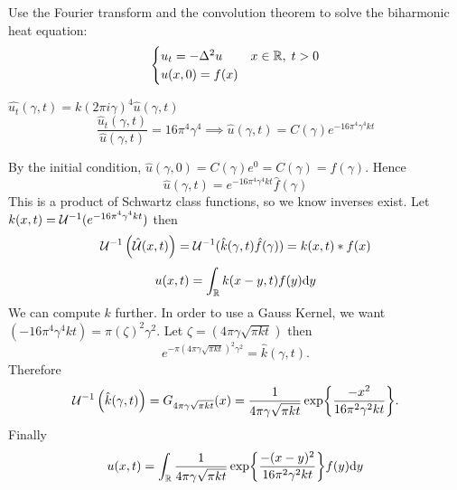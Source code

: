 Use the Fourier transform and the convolution theorem to solve the biharmonic heat equation:
$$\begin{cases}
    u_t = -\Delta^2 u & x \in \mathbb{R}, \; t>0\\
    u(x,0) = f(x)
\end{cases}
$$

\soln* 

$\hat{u_t}(\gamma, t) = k (2\pi i \gamma)^4 \hat{u}(\gamma, t)$
$$\frac{\hat{u}_t(\gamma, t)}{\hat{u}(\gamma, t)} = 16\pi^4 \gamma^4 \implies \hat{u}(\gamma,t) = C(\gamma)e^{-16\pi^4 \gamma^4 kt}$$

\nl By the initial condition, $\hat{u}(\gamma, 0) = C(\gamma)e^{0} = C(\gamma) = \hat{f}(\gamma)$. Hence
$$\hat{u}(\gamma, t) = e^{-16\pi^4 \gamma^4 kt}\hat{f}(\gamma)$$
This is a product of Schwartz class functions, so we know inverses exist. 
Let $k(x,t) = \mathcal{U}^{-1}(e^{-16\pi^4 \gamma^4 kt})$ then $$\mcu^{-1}\pars{\hat{\mcu}(x,t)} = \mcu^{-1}(\hat{k}(\gamma,t)\hat{f}(\gamma)) = k(x,t) \ast f(x)$$
$$u(x,t) = \int_{\mathbb{R}} k(x-y,t)f(y)\dd y$$
We can compute $k$ further. In order to use a Gauss Kernel, we want $(-16\pi^4 \gamma^4 kt) = \pi(\zeta)^2\gamma^2$. Let $\zeta = (4\pi\gamma \sqrt{\pi kt})$ then 
$$e^{-\pi (4 \pi \gamma \sqrt{\pi kt})^2 \gamma^2} = \hat{k}(\gamma,t).$$ 
Therefore
$$\mcu^{-1}\pars{\hat{k}(\gamma,t)} = G_{4 \pi \gamma \sqrt{\pi kt}}(x) = \over{4 \pi \gamma \sqrt{\pi kt}}\exp{\frac{-x^2}{16\pi^2 \gamma^2 kt}}.$$
Finally $$u(x,t) = \intreal \over{4 \pi \gamma \sqrt{\pi kt}}\exp{\frac{-(x-y)^2}{16\pi^2 \gamma^2 kt}} f(y) \dd y$$